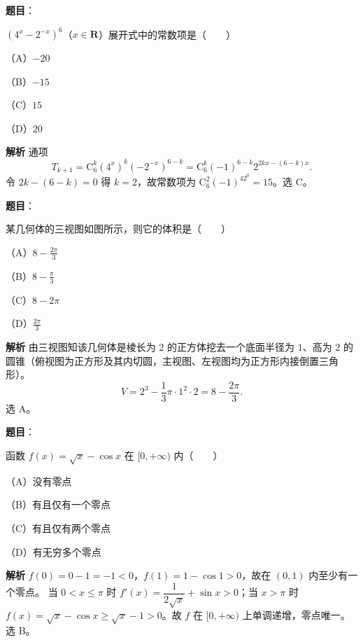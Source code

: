 \begin{answer}

\textbf{题目}：

$(4^x-2^{-x})^6$（$x\in\mathbf R$）展开式中的常数项是\mbox{（　　）}

（A）$-20$

（B）$-15$

（C）$15$

（D）$20$

\textbf{解析}
通项
\nopagebreak[4]
\[T_{k+1}=\mathrm C_6^k\left(4^x\right)^k\left(-2^{-x}\right)^{6-k}=\mathrm C_6^k(-1)^{6-k}2^{2kx-(6-k)x}.\]
令 $2k-(6-k)=0$ 得 $k=2$，故常数项为 $\mathrm C_6^2(-1)^42^0=15$。选 C。


\end{answer}
\begin{answer}

\textbf{题目}：

某几何体的三视图如图所示，则它的体积是\mbox{（　　）}

（A）$8-\frac{2\pi}3$

（B）$8-\frac{\pi}3$

（C）$8-2\pi$

（D）$\frac{2\pi}3$
\nopagebreak[4]
\begin{center}\end{center}
\nopagebreak[4]
\textbf{解析}
由三视图知该几何体是棱长为 $2$ 的正方体挖去一个底面半径为 $1$、高为 $2$ 的圆锥（俯视图为正方形及其内切圆，主视图、左视图均为正方形内接倒置三角形）。
\nopagebreak[4]
\[V=2^3-\frac13\pi\cdot1^2\cdot2=8-\frac{2\pi}3.\]
选 A。


\end{answer}
\begin{answer}

\textbf{题目}：

函数 $f(x)=\sqrt x-\cos x$ 在 $[0,+\infty)$ 内\mbox{（　　）}

（A）没有零点

（B）有且仅有一个零点

（C）有且仅有两个零点

（D）有无穷多个零点

\textbf{解析}
$f(0)=0-1=-1<0$，$f(1)=1-\cos1>0$，故在 $(0,1)$ 内至少有一个零点。
当 $0<x\leqslant\pi$ 时 $f'(x)=\dfrac1{2\sqrt x}+\sin x>0$；当 $x>\pi$ 时 $f(x)=\sqrt x-\cos x\geqslant\sqrt x-1>0$。故 $f$ 在 $[0,+\infty)$ 上单调递增，零点唯一。选 B。


\end{answer}
